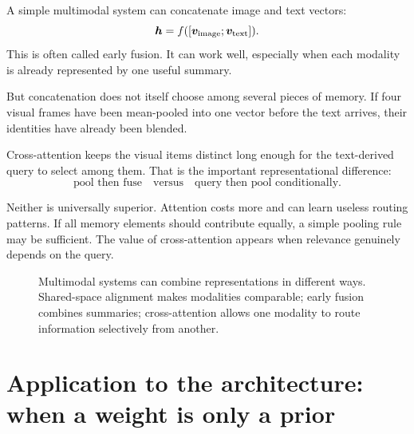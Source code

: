 A simple multimodal system can concatenate image and text vectors:
\[
  \bm{h}=f([\bm{v}_{\mathrm{image}};\bm{v}_{\mathrm{text}}]).
\]
This is often called early fusion. It can work well, especially when each modality is already represented by one useful summary.

But concatenation does not itself choose among several pieces of memory. If four visual frames have been mean-pooled into one vector before the text arrives, their identities have already been blended.

Cross-attention keeps the visual items distinct long enough for the text-derived query to select among them. That is the important representational difference:
\[
  \text{pool then fuse}
  \quad\text{versus}\quad
  \text{query then pool conditionally}.
\]

Neither is universally superior. Attention costs more and can learn useless routing patterns. If all memory elements should contribute equally, a simple pooling rule may be sufficient. The value of cross-attention appears when relevance genuinely depends on the query.

\begin{figure}[ht]
  \caption{Multimodal systems can combine representations in different ways. Shared-space alignment makes modalities comparable; early fusion combines summaries; cross-attention allows one modality to route information selectively from another.}
  \label{fig:week9-multimodal-routing}
\end{figure}

\section{Application to the architecture: when a weight is only a prior}

